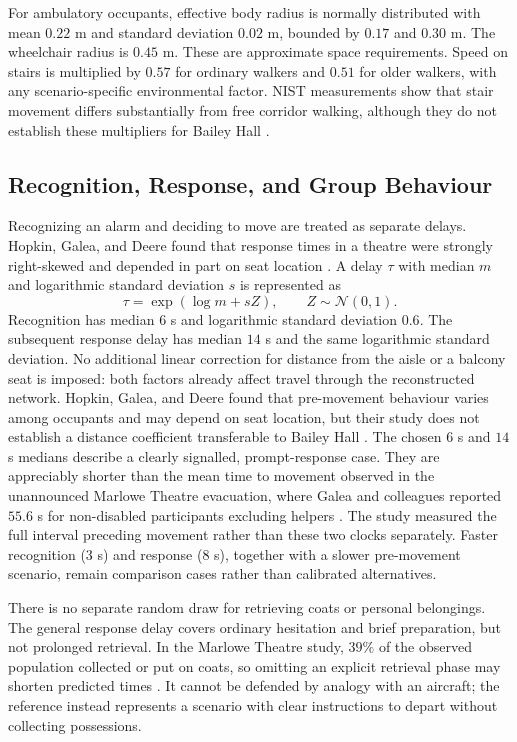 \documentclass[11pt,a4paper]{article}
\begin{document}
For ambulatory occupants, effective body radius is normally distributed with mean $0.22$ m and standard deviation $0.02$ m, bounded by $0.17$ and $0.30$ m. The wheelchair radius is $0.45$ m. These are approximate space requirements. Speed on stairs is multiplied by $0.57$ for ordinary walkers and $0.51$ for older walkers, with any scenario-specific environmental factor. NIST measurements show that stair movement differs substantially from free corridor walking, although they do not establish these multipliers for Bailey Hall \cite{nist}.

\subsection{Recognition, Response, and Group Behaviour}

Recognizing an alarm and deciding to move are treated as separate delays. Hopkin, Galea, and Deere found that response times in a theatre were strongly right-skewed and depended in part on seat location \cite{hopkin}. A delay $\tau$ with median $m$ and logarithmic standard deviation $s$ is represented as
\begin{equation}\label{eq:lognormal-time}
\tau=\exp(\log m+sZ),\qquad Z\sim\mathcal N(0,1).
\end{equation}
Recognition has median $6$ s and logarithmic standard deviation $0.6$. The subsequent response delay has median $14$ s and the same logarithmic standard deviation. No additional linear correction for distance from the aisle or a balcony seat is imposed: both factors already affect travel through the reconstructed network. Hopkin, Galea, and Deere found that pre-movement behaviour varies among occupants and may depend on seat location, but their study does not establish a distance coefficient transferable to Bailey Hall \cite{hopkin}. The chosen $6$ s and $14$ s medians describe a clearly signalled, prompt-response case. They are appreciably shorter than the mean time to movement observed in the unannounced Marlowe Theatre evacuation, where Galea and colleagues reported $55.6$ s for non-disabled participants excluding helpers \cite{galea2017theatre}. The study measured the full interval preceding movement rather than these two clocks separately. Faster recognition ($3$ s) and response ($8$ s), together with a slower pre-movement scenario, remain comparison cases rather than calibrated alternatives.

There is no separate random draw for retrieving coats or personal belongings. The general response delay covers ordinary hesitation and brief preparation, but not prolonged retrieval. In the Marlowe Theatre study, $39\%$ of the observed population collected or put on coats, so omitting an explicit retrieval phase may shorten predicted times \cite{galea2017theatre}. It cannot be defended by analogy with an aircraft; the reference instead represents a scenario with clear instructions to depart without collecting possessions.
\end{document}
